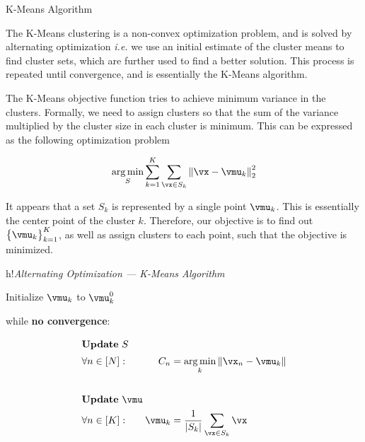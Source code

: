\documentclass{article}
\begin{document}
\begin{ssection}{K-Means Algorithm}

    The K-Means clustering is a non-convex optimization problem, and is solved by alternating optimization \textit{i.e.} we use an initial estimate of the cluster means to find cluster sets, which are further used to find a better solution. This process is repeated until convergence, and is essentially the K-Means algorithm. \br%

    The K-Means objective function tries to achieve minimum variance in the clusters. Formally, we need to assign clusters so that the sum of the variance multiplied by the cluster size in each cluster is minimum. This can be expressed as the following optimization problem

    \begin{equation}
        \argmin_{S} \sum_{k = 1}^{K} \sum_{\vx \in S_k} \norm{\vx - \vmu_k}_2^2
        \label{eq:obj}
    \end{equation}

    It appears that a set $S_k$ is represented by a single point $\vmu_k$. This is essentially the center point of the cluster $k$. Therefore, our objective is to find out $\bset{\vmu_k}_{k = 1}^{K}$, as well as assign clusters to each point, such that the objective is minimized. \br%

     \br%

    \begin{salgorithm}[0.9\textwidth]{h!}{\textit{Alternating Optimization --- K-Means Algorithm}}

        Initialize $\vmu_k$ to $\vmu_k^0$

        while \textbf{no convergence}:
        \begin{margin}
            
            \begin{align*}
                \shortintertext{\textbf{Update} $S$}
                &\forall n \in \brac{N}: \quad &C_n     &= \argmin_k \norm{\vx_n - \vmu_k} \\
                \\
                \shortintertext{\textbf{Update} $\vmu$}
                &\forall n \in \brac{K}: \quad &\vmu_k  &= \frac{1}{\abs{S_k}} \sum_{\vx \in S_k} \vx
            \end{align*}

        \end{margin}
         

\end{salgorithm}
\end{ssection}
\end{document}
